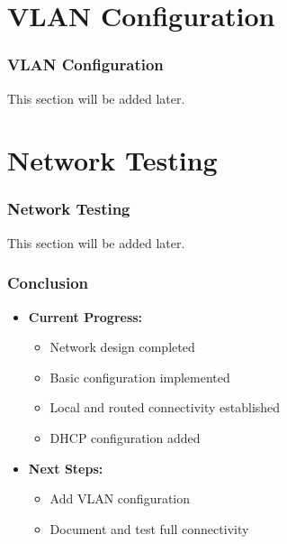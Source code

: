\documentclass{beamer}
\begin{document}
\section{VLAN Configuration}
\begin{frame}[fragile,label=vlans]
\frametitle{VLAN Configuration}
This section will be added later.
\end{frame}

\section{Network Testing}
\begin{frame}[fragile,label=testing]
\frametitle{Network Testing}
This section will be added later.
\end{frame}

\begin{frame}
\frametitle{Conclusion}
\begin{itemize}
    \item \textbf{Current Progress:}
    \begin{itemize}
        \item Network design completed
        \item Basic configuration implemented
        \item Local and routed connectivity established
        \item DHCP configuration added
    \end{itemize}
    \item \textbf{Next Steps:}
    \begin{itemize}
        \item Add VLAN configuration
        \item Document and test full connectivity
    \end{itemize}
\end{itemize}
\end{frame}
\end{document}

